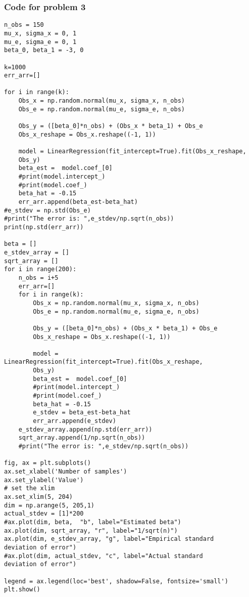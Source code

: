\documentclass[12pt]{article}%
\begin{document}
\subsubsection*{Code for problem 3}
\begin{lstlisting}
n_obs = 150
mu_x, sigma_x = 0, 1
mu_e, sigma_e = 0, 1
beta_0, beta_1 = -3, 0

k=1000
err_arr=[]

for i in range(k):
    Obs_x = np.random.normal(mu_x, sigma_x, n_obs)
    Obs_e = np.random.normal(mu_e, sigma_e, n_obs)

    Obs_y = ([beta_0]*n_obs) + (Obs_x * beta_1) + Obs_e
    Obs_x_reshape = Obs_x.reshape((-1, 1))

    model = LinearRegression(fit_intercept=True).fit(Obs_x_reshape,
    Obs_y)
    beta_est =  model.coef_[0]
    #print(model.intercept_)
    #print(model.coef_)
    beta_hat = -0.15
    err_arr.append(beta_est-beta_hat)
#e_stdev = np.std(Obs_e)
#print("The error is: ",e_stdev/np.sqrt(n_obs))
print(np.std(err_arr))

beta = []
e_stdev_array = []
sqrt_array = []
for i in range(200):
    n_obs = i+5
    err_arr=[]
    for i in range(k):
        Obs_x = np.random.normal(mu_x, sigma_x, n_obs)
        Obs_e = np.random.normal(mu_e, sigma_e, n_obs)

        Obs_y = ([beta_0]*n_obs) + (Obs_x * beta_1) + Obs_e
        Obs_x_reshape = Obs_x.reshape((-1, 1))

        model = LinearRegression(fit_intercept=True).fit(Obs_x_reshape,
        Obs_y)
        beta_est =  model.coef_[0]
        #print(model.intercept_)
        #print(model.coef_)
        beta_hat = -0.15
        e_stdev = beta_est-beta_hat
        err_arr.append(e_stdev)
    e_stdev_array.append(np.std(err_arr))
    sqrt_array.append(1/np.sqrt(n_obs))
    #print("The error is: ",e_stdev/np.sqrt(n_obs))
    
fig, ax = plt.subplots()
ax.set_xlabel('Number of samples') 
ax.set_ylabel('Value')
# set the xlim
ax.set_xlim(5, 204)
dim = np.arange(5, 205,1)
actual_stdev = [1]*200
#ax.plot(dim, beta,  "b", label="Estimated beta")
ax.plot(dim, sqrt_array, "r", label="1/sqrt(n)") 
ax.plot(dim, e_stdev_array, "g", label="Empirical standard 
deviation of error")
#ax.plot(dim, actual_stdev, "c", label="Actual standard
deviation of error") 

legend = ax.legend(loc='best', shadow=False, fontsize='small')
plt.show()
\end{lstlisting}
\end{document}
